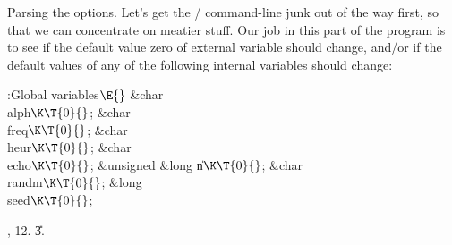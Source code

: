 Parsing the options. Let's get the \UNIX/ command-line junk out of the
way first, so that we can concentrate on meatier stuff. Our job in this part
of the program is to see if the default value zero of external variable
 should change, and/or if the default values of any of the
following
internal variables should change:

\Y\B\4:Global variables\X${}\E{}$\6
\&{char} \\{alph}${}\K\T{0}{}$;\6
\&{char} \\{freq}${}\K\T{0}{}$;\6
\&{char} \\{heur}${}\K\T{0}{}$;\6
\&{char} \\{echo}${}\K\T{0}{}$;\6
\&{unsigned} \&{long} \|n${}\K\T{0}{}$;\6
\&{char} \\{randm}${}\K\T{0}{}$;\6
\&{long} \\{seed}${}\K\T{0}{}$;\par
{}, 12.
\U3.\fi

